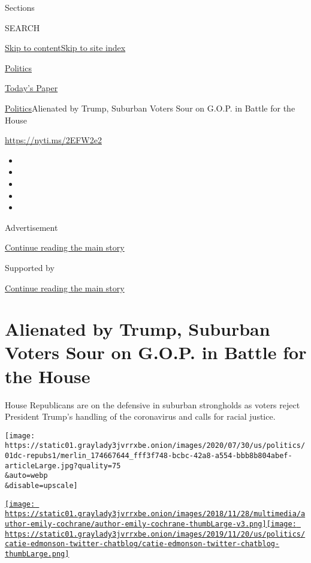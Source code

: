 Sections

SEARCH

\protect\hyperlink{site-content}{Skip to
content}\protect\hyperlink{site-index}{Skip to site index}

\href{https://www.nytimes3xbfgragh.onion/section/politics}{Politics}

\href{https://myaccount.nytimes3xbfgragh.onion/auth/login?response_type=cookie\&client_id=vi}{}

\href{https://www.nytimes3xbfgragh.onion/section/todayspaper}{Today's
Paper}

\href{/section/politics}{Politics}\textbar{}Alienated by Trump, Suburban
Voters Sour on G.O.P. in Battle for the House

\url{https://nyti.ms/2EFW2e2}

\begin{itemize}
\item
\item
\item
\item
\item
\end{itemize}

Advertisement

\protect\hyperlink{after-top}{Continue reading the main story}

Supported by

\protect\hyperlink{after-sponsor}{Continue reading the main story}

\hypertarget{alienated-by-trump-suburban-voters-sour-on-gop-in-battle-for-the-house}{%
\section{Alienated by Trump, Suburban Voters Sour on G.O.P. in Battle
for the
House}\label{alienated-by-trump-suburban-voters-sour-on-gop-in-battle-for-the-house}}

House Republicans are on the defensive in suburban strongholds as voters
reject President Trump's handling of the coronavirus and calls for
racial justice.

\texttt{[image: https://static01.graylady3jvrrxbe.onion/images/2020/07/30/us/politics/01dc-repubs1/merlin\_174667644\_fff3f748-bcbc-42a8-a554-bbb8b804abef-articleLarge.jpg?quality=75\\\&auto=webp\\\&disable=upscale]}

\href{https://www.nytimes3xbfgragh.onion/by/emily-cochrane}{\texttt{[image: https://static01.graylady3jvrrxbe.onion/images/2018/11/28/multimedia/author-emily-cochrane/author-emily-cochrane-thumbLarge-v3.png]}}\href{https://www.nytimes3xbfgragh.onion/by/catie-edmondson}{\texttt{[image: https://static01.graylady3jvrrxbe.onion/images/2019/11/20/us/politics/catie-edmonson-twitter-chatblog/catie-edmonson-twitter-chatblog-thumbLarge.png]}}

